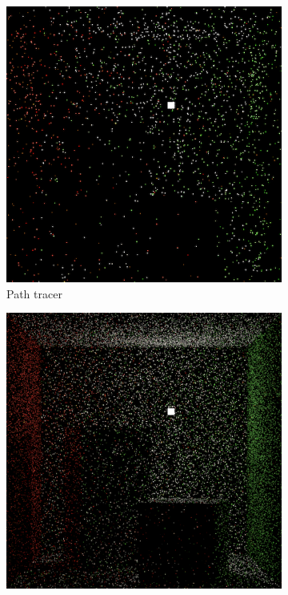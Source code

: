 \begin{figure}[ht]
    \centering
    \begin{subfigure}[b]{0.32\textwidth}
        \centering
        \includegraphics[width=\textwidth]{images/03-sampling_path.jpg}
        \caption{Path tracer}
        \vspace*{5mm}
        \label{fig:methods_sampling_path}
    \end{subfigure}
    \hfill
    \begin{subfigure}[b]{0.32\textwidth}
        \centering
        \includegraphics[width=\textwidth]{images/03-sampling_bdpt.jpg}

\end{subfigure}
\end{figure}
